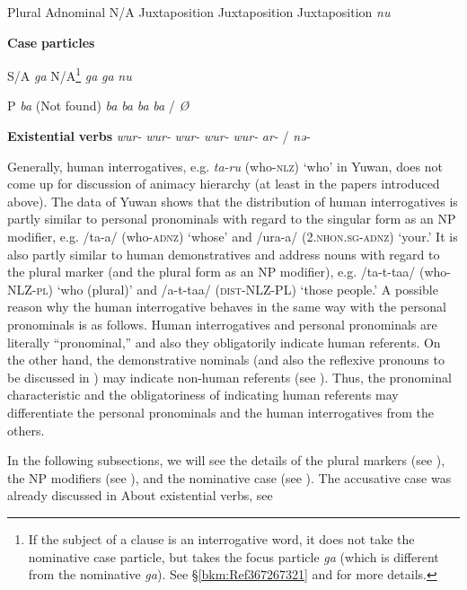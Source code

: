 \begin{table}
\begin{table}
Plural  Adnominal  N/A  Juxtaposition  Juxtaposition  Juxtaposition  \textit{nu}

\textbf{Case} \textbf{particles}          

S/A     \textit{ga}  N/A\footnote{If the subject of a clause is an interrogative word, it does not take the nominative case particle, but takes the focus particle \textit{ga} (which is different from the nominative \textit{ga}). See §\ref{bkm:Ref367267321} and  for more details.}  \textit{ga}  \textit{ga}  \textit{nu}

P     \textit{ba}  (Not found)  \textit{ba}  \textit{ba}  \textit{ba}  \textit{ba} / \textit{Ø}

\textbf{Existential} \textbf{verbs}      \textit{wur-}  \textit{wur-}  \textit{wur-}  \textit{wur-}  \textit{wur-}  \textit{ar-} / \textit{nə-}
\end{table}

Generally, human interrogatives, e.g. \textit{ta-ru} (who-\textsc{nlz}) ‘who’ in Yuwan, does not come up for discussion of animacy hierarchy (at least in the papers introduced above). The data of Yuwan shows that the distribution of human interrogatives is partly similar to personal pronominals with regard to the singular form as an NP modifier, e.g. /ta-a/ (who-\textsc{adnz}) ‘whose’ and /ura-a/ (2.\textsc{nhon}.\textsc{sg}-\textsc{adnz}) ‘your.’ It is also partly similar to human demonstratives and address nouns with regard to the plural marker (and the plural form as an NP modifier), e.g. /ta-t-taa/ (who-NLZ-\textsc{pl}) ‘who (plural)’ and /a-t-taa/ (\textsc{dist}-NLZ-PL) ‘those people.’ A possible reason why the human interrogative behaves in the same way with the personal pronominals is as follows. Human interrogatives and personal pronominals are literally “pronominal,” and also they obligatorily indicate human referents. On the other hand, the demonstrative nominals (and also the reflexive pronouns to be discussed in ) may indicate non-human referents (see ). Thus, the pronominal characteristic and the obligatoriness of indicating human referents may differentiate the personal pronominals and the human interrogatives from the others.

In the following subsections, we will see the details of the plural markers (see ), the NP modifiers (see ), and the nominative case (see ). The accusative case was already discussed in  About existential verbs, see 


\end{table}
